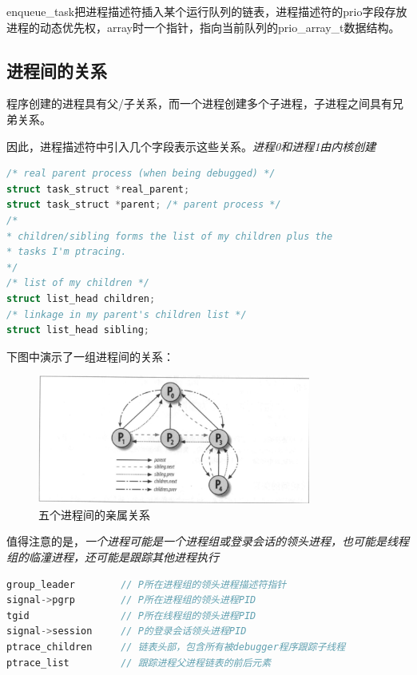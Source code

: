     enqueue\_task把进程描述符插入某个运行队列的链表，进程描述符的prio字段存放进程的动态优先权，array时一个指针，指向当前队列的prio\_array\_t数据结构。

\subsection{进程间的关系}

    程序创建的进程具有父/子关系，而一个进程创建多个子进程，子进程之间具有兄弟关系。

    因此，进程描述符中引入几个字段表示这些关系。\emph{进程0和进程1由内核创建}

\begin{lstlisting}[language=C++]
/* real parent process (when being debugged) */
struct task_struct *real_parent; 
struct task_struct *parent;	/* parent process */
/*
* children/sibling forms the list of my children plus the
* tasks I'm ptracing.
*/
/* list of my children */
struct list_head children;	
/* linkage in my parent's children list */
struct list_head sibling;	
\end{lstlisting}

    下图中演示了一组进程间的关系：

\begin{figure}[!htbp]
    \centering
    \includegraphics[width=0.8\textwidth]{image/chapter03/五个进程间的亲属关系.png}
    \caption{五个进程间的亲属关系}
\end{figure}

    值得注意的是，\emph{一个进程可能是一个进程组或登录会话的领头进程，也可能是线程组的临潼进程，还可能是跟踪其他进程执行}

\begin{lstlisting}[language=C++]
group_leader        // P所在进程组的领头进程描述符指针
signal->pgrp        // P所在进程组的领头进程PID
tgid                // P所在线程组的领头进程PID
signal->session     // P的登录会话领头进程PID
ptrace_children     // 链表头部，包含所有被debugger程序跟踪子线程
ptrace_list         // 跟踪进程父进程链表的前后元素
\end{lstlisting}

